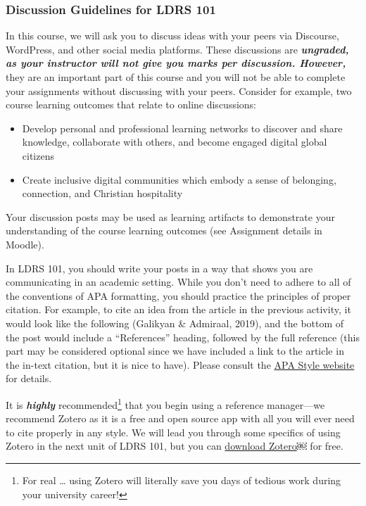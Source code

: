 \documentclass[
  letterpaper,
  DIV=11,
  numbers=noendperiod]{scrreprt}
\providecommand{\tightlist}{%
  \setlength{\itemsep}{0pt}\setlength{\parskip}{0pt}}\usepackage{longtable,booktabs,array}
\begin{document}
\subsubsection*{Discussion Guidelines for LDRS
101}\label{discussion-guidelines-for-ldrs-101}

In this course, we will ask you to discuss ideas with your peers via
Discourse, WordPress, and other social media platforms. These
discussions are \textbf{\emph{ungraded, as your instructor will not give
you marks per discussion. However,}} they are an important part of this
course and you will not be able to complete your assignments without
discussing with your peers. Consider for example, two course learning
outcomes that relate to online discussions:

\begin{itemize}
\tightlist
\item
  Develop personal and professional learning networks to discover and
  share knowledge, collaborate with others, and become engaged digital
  global citizens
\item
  Create inclusive digital communities which embody a sense of
  belonging, connection, and Christian hospitality
\end{itemize}

Your discussion posts may be used as learning artifacts to demonstrate
your understanding of the course learning outcomes (see Assignment
details in Moodle).

In LDRS 101, you should write your posts in a way that shows you are
communicating in an academic setting. While you don't need to adhere to
all of the conventions of APA formatting, you should practice the
principles of proper citation. For example, to cite an idea from the
article in the previous activity, it would look like the following
(Galikyan \& Admiraal, 2019), and the bottom of the post would include a
``References'' heading, followed by the full reference (this part may be
considered optional since we have included a link to the article in the
in-text citation, but it is nice to have). Please consult the
\href{https://apastyle.apa.org/style-grammar-guidelines}{APA Style
website} for details.

It is \textbf{\emph{highly}} recommended\footnote{For real \ldots{}
  using Zotero will literally save you days of tedious work during your
  university career!} that you begin using a reference manager---we
recommend Zotero as it is a free and open source app with all you will
ever need to cite properly in any style. We will lead you through some
specifics of using Zotero in the next unit of LDRS 101, but you can
\href{https://www.zotero.org/}{download Zotero}￼ for free.
\end{document}
